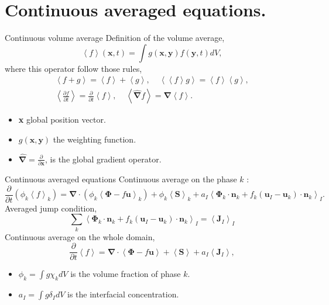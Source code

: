 \documentclass{sintefbeamer}
\newcommand{\avg}[1]{\left<#1\right>}
\newcommand{\kavg}[1]{\left<#1\right>_k}
\newcommand{\Iavg}[1]{\left<#1\right>_I}
\newcommand{\nablab}{\bm{\nabla}}
\newcommand{\nablabh}{\hat{\bm{\nabla}}}
\newcommand{\pddt}{\frac{\partial}{\partial t}}
\begin{document}
\section{Continuous averaged equations.}
\begin{frame}{Continuous volume average}
Definition of the volume average, 
  \begin{equation}
    \left<f\right>(\textbf{x},t) = \int g(\textbf{x},\textbf{y}) f(\textbf{y},t)dV,
    \label{eq:avg}
\end{equation}
where this operator follow those rules,
\begin{align}
  \left<f+g\right> = \left<f\right>+\left<g\right>, \;\;\;\;
  \left<\left<f\right>g\right> = \left<f\right>\left<g\right>, \\
  \left<\frac{\partial f}{\partial t}\right> 
  = \pddt\left<f\right>, \;\;\;\;
  \left<\nablabh f\right> 
  = \nablab\left<f\right>. 
  \label{eq:avg_properties}
\end{align}
\begin{itemize}
  \item \textbf{x} global position vector. 
  \item $g(\textbf{x},\textbf{y})$ the weighting function. 
  \item $\nablabh = \frac{\partial}{\partial \textbf{x}}$, is the global gradient operator.
\end{itemize}
\end{frame}

\begin{frame}{Continuous averaged equations}
  Continuous average on the phase $k$ : 
  \begin{equation*}
    \pddt (\phi_k\kavg{f})
    = \nablab \cdot \left(
        \phi_k \kavg{\bm{\Phi} - f \textbf{u}}
    \right)
    + \phi_k \kavg{\textbf{S}}
    + a_I \Iavg{
        \bm{\Phi}_k \cdot \textbf{n}_k
        + f_k 
        \left(
            \textbf{u}_I
            - \textbf{u}_k
        \right) \cdot \textbf{n}_k
    }.
    \label{eq:avg_k_global}
\end{equation*}
Averaged jump condition, 
\begin{equation}
  \sum_k 
  \Iavg{
      \bm{\Phi}_k 
      \cdot \textbf{n}_k
      + f_k 
      \left(
          \textbf{u}_I
          - \textbf{u}_k
      \right) 
      \cdot \textbf{n}_k
  }
  = \Iavg{\textbf{J}_I}
  \label{eq:general_jump}
\end{equation}
Continuous average on the whole domain, 
\begin{equation*}
  \pddt \avg{f}
  = \nablab \cdot \avg{\bm{\Phi} - f \textbf{u}}
  + \avg{\textbf{S}}
  + a_I\avg{\textbf{J}_I},
  \label{eq:avg_global}
\end{equation*}
\begin{itemize}
  \item $\phi_k = \int g \chi_k dV$ is the volume fraction of phase $k$. 
  \item $a_I = \int g \delta_I dV$ is the interfacial concentration. 
\end{itemize}
\end{frame}
\end{document}
